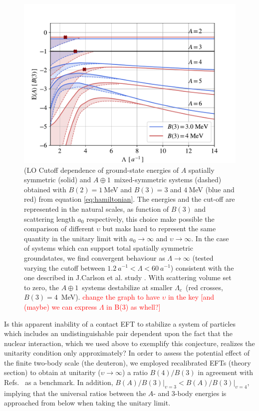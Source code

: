 \documentclass[preprint,12pt]{elsarticle}
\newcommand{\lc}{\ensuremath{\Lambda_c}}
\newcommand{\abb}{\mbox{\ensuremath{A\oplus 1}}}
\newcommand{\red}[1]{\textcolor{red}{#1}}
\begin{document}
%
\begin{figure}
    \centering
        \centering
        \includegraphics[width=\linewidth]{./p-systems-vs-l} 
        \caption{(LO Cutoff dependence of ground-state energies of $A$ spatially symmetric (solid) and \abb~mixed-symmetric systems
        (dashed) obtained with $B(2)=1~$MeV and $B(3)=3$ and $4~$MeV (blue and red) from equation \ref{eq:hamiltonian}. 
        The energies and the cut-off are represented in the natural scales, as function of $B(3)$ and scattering length $a_0$ respectively, this choice make possible the comparison of different $\upsilon$ but maks hard to represent the same quantity in the unitary limit with $a_0\rightarrow\infty$ and $\upsilon\rightarrow\infty$. 
        In the case of systems which can support total spatially symmetric groundstates, we find convergent behaviour as $\Lambda\to\infty$ (tested varying the cutoff between $1.2~a^{-1}<\Lambda<60~a^{-1}$) consistent with the one described in J.Carlson et al. study \cite{manybosons}.
        With scattering volume set to zero, the \abb~systems destabilize at smaller \lc~(red crosses, $B(3)=4$~MeV). 
        \red{change the graph to have $\upsilon$ in the key [and (maybe) we can express $\Lambda$ in B(3) as whell?] }}
        \label{fig:threshold}
\end{figure} 
%

Is this apparent inability of a contact EFT to stabilize a system of particles
which includes an undistinguishable pair dependent upon the fact that the nuclear interaction,
which we used above to exemplify this conjecture, realizes the unitarity condition only
approximately?
In order to assess the potential effect of the finite two-body scale (the deuteron),
we employed recalibrated EFTs (theory section) to obtain
at unitarity ($\upsilon\rightarrow \infty$) a ratio $B(4)/B(3)$ in agreement with 
Refs.~\cite{Hammer:2006ct,2009NatPh...5..417V}  as a benchmark.
In addition, \mbox{$B(A)/B(3)\Big\vert_{\upsilon=3}<B(A)/B(3)\Big\vert_{\upsilon=4}$}, implying that the universal ratios between the $A$- and 3-body energies is approached from below when taking the unitary limit.
\end{document}
